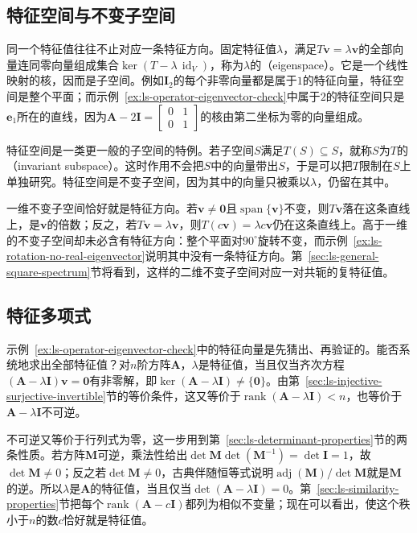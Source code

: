 \subsection{特征空间与不变子空间}

同一个特征值往往不止对应一条特征方向。固定特征值$\lambda$，满足$T\bm v=\lambda\bm v$的全部向量连同零向量组成集合$\ker(T-\lambda\,\operatorname{id}_V)$，称为$\lambda$的（eigenspace）。它是一个线性映射的核，因而是子空间。例如$\bm I_2$的每个非零向量都是属于$1$的特征向量，特征空间是整个平面；而示例~\ref{ex:ls-operator-eigenvector-check}中属于$2$的特征空间只是$\bm e_1$所在的直线，因为$\bm A-2\bm I=\left[\begin{smallmatrix}0&1\\0&1\end{smallmatrix}\right]$的核由第二坐标为零的向量组成。

特征空间是一类更一般的子空间的特例。若子空间$S$满足$T(S)\subseteq S$，就称$S$为$T$的（invariant subspace）。这时作用不会把$S$中的向量带出$S$，于是可以把$T$限制在$S$上单独研究。特征空间是不变子空间，因为其中的向量只被乘以$\lambda$，仍留在其中。

一维不变子空间恰好就是特征方向。若$\bm v\neq\bm0$且$\operatorname{span}\{\bm v\}$不变，则$T\bm v$落在这条直线上，是$\bm v$的倍数；反之，若$T\bm v=\lambda\bm v$，则$T(c\bm v)=\lambda c\bm v$仍在这条直线上。高于一维的不变子空间却未必含有特征方向：整个平面对$90^\circ$旋转不变，而示例~\ref{ex:ls-rotation-no-real-eigenvector}说明其中没有一条特征方向。第~\ref{sec:ls-general-square-spectrum}节将看到，这样的二维不变子空间对应一对共轭的复特征值。

\subsection{特征多项式}
\label{sec:ls-characteristic-polynomial}

示例~\ref{ex:ls-operator-eigenvector-check}中的特征向量是先猜出、再验证的。能否系统地求出全部特征值？对$n$阶方阵$\bm A$，$\lambda$是特征值，当且仅当齐次方程$(\bm A-\lambda\bm I)\bm v=\bm0$有非零解，即$\ker(\bm A-\lambda\bm I)\neq\{\bm0\}$。由第~\ref{sec:ls-injective-surjective-invertible}节的等价条件，这又等价于$\operatorname{rank}(\bm A-\lambda\bm I)<n$，也等价于$\bm A-\lambda\bm I$不可逆。

不可逆又等价于行列式为零，这一步用到第~\ref{sec:ls-determinant-properties}节的两条性质。若方阵$\bm M$可逆，乘法性给出$\det\bm M\det(\bm M^{-1})=\det\bm I=1$，故$\det\bm M\neq0$；反之若$\det\bm M\neq0$，古典伴随恒等式说明$\operatorname{adj}(\bm M)/\det\bm M$就是$\bm M$的逆。所以$\lambda$是$\bm A$的特征值，当且仅当$\det(\bm A-\lambda\bm I)=0$。第~\ref{sec:ls-similarity-properties}节把每个$\operatorname{rank}(\bm A-c\bm I)$都列为相似不变量；现在可以看出，使这个秩小于$n$的数$c$恰好就是特征值。

